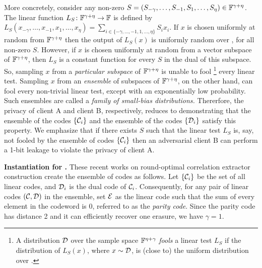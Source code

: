 More concretely, consider any non-zero $S=(S_{-\gamma},\dotsc,S_{-1},S_1,\dotsc,S_\eta) \in {\mathbb F}^{\gamma + \eta}$. 
The linear function $L_S\colon{\mathbb F}^{\gamma + \eta}\to{\mathbb F}$ is defined by $L_S(x_{-\gamma},\dotsc,x_{-1},x_1,\dotsc,x_\eta) = \sum_{i\in\{-\gamma,\dotsc,-1,1,\dotsc,\eta\}} S_ix_i$. 
If $x$ is chosen uniformly at random from  ${\mathbb F}^{\gamma + \eta}$ then the output of $L_S(x)$ is uniformly random over \bbF, for all non-zero $S$. 
However, if $x$ is chosen uniformly at random from a vector subspace of ${\mathbb F}^{\gamma + \eta}$, then $L_S$ is a constant function for every $S$ in the dual of this subspace.  
So, sampling $x$ from a {\em particular subspace} of ${\mathbb F}^{\gamma + \eta}$ is unable to fool%
\footnote{
	A distribution ${\mathcal D}$ over the sample space ${\mathbb F}^{\eta+\gamma}$ {\em fools} a linear test $L_S$ if the distribution of $L_S(x)$, where $x\sim {\mathcal D}$, is (close to) the uniform distribution over \bbF. 
}
every linear test.
Sampling $x$ from an {\em ensemble} of subspaces of ${\mathbb F}^{\gamma + \eta}$, on the other hand, can fool every non-trivial linear test, except with an exponentially low probability. 
Such ensembles are called a {\em family of small-bias distributions.} 
Thererfore, the privacy of client A and client B, respectively, reduces to demonstrating that the ensemble of the codes $\{{\mathcal C}_i\}$ and the ensemble of the codes $\{{\mathcal D}_i\}$ satisfy this property.  
We emphasize that if there exists $S$ such that the linear test $L_S$ is, say, not fooled by the ensemble of codes $\{{\mathcal C}_i\}$ then an adversarial client B can perform a 1-bit leakage to violate the privacy of client A. 


\noindent\textbf{Instantiation for \cite{ISIT:IMSW14,C:GIMS15}.} 
These recent works on round-optimal correlation extractor construction create the ensemble of codes as follows. 
Let $\{{\mathcal C}_i\}$ be the set of all linear codes, and ${\mathcal D}_i$ is the dual code of ${\mathcal C}_i$. 
Consequently, for any pair of linear codes $({\mathcal C},{\mathcal D})$ in the ensemble, set ${\mathcal E}$ as the linear code such that the sum of every element in the codeword is 0, referred to as the {\em parity code}. Since the parity code has distance 2 and it can efficiently recover one erasure, we have $\gamma=1$. 



